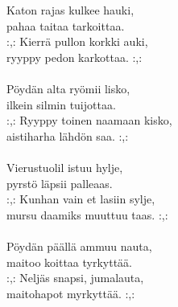 
Katon rajas kulkee hauki, \\ pahaa taitaa tarkoittaa. \\ :,: Kierrä pullon korkki auki, \\ ryyppy pedon karkottaa. :,: \\ \hspace{10mm} \\ Pöydän alta ryömii lisko, \\ ilkein silmin tuijottaa. \\ :,: Ryyppy toinen naamaan kisko, \\ aistiharha lähdön saa. :,: \\ \hspace{10mm} \\ Vierustuolil istuu hylje, \\ pyrstö läpsii palleaas. \\ :,: Kunhan vain et lasiin sylje, \\ mursu daamiks muuttuu taas. :,: \\ \hspace{10mm} \\ Pöydän päällä ammuu nauta, \\ maitoo koittaa tyrkyttää. \\ :,: Neljäs snapsi, jumalauta, \\ maitohapot myrkyttää. :,: